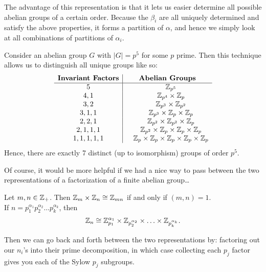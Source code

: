 \documentclass{memoir}
\begin{document}
The advantage of this representation is that it lets us easier determine all possible abelian groups of a certain order. Because the \(\beta_i\) are all uniquely determined and satisfy the above properties, it forms a partition of  \(\alpha  \), and hence we simply look at all combinations of partitions of \(\alpha_i\).

\begin{exmp}
	Consider an abelian group \(G\) with \(\left| G \right| = p^{5}\) for some \(p\) prime. Then this technique allows us to distinguish all unique groups like so:
	\begin{align*}
		\begin{array}{c | c}
		\textbf{Invariant Factors} & \textbf{Abelian Groups}\\
			\hline
		5 &\quad \mathbb{Z}_{p^{5}}\\
		4,1 &\quad \mathbb{Z}_{p^{4}}\times \mathbb{Z}_p\\
		3,2 &\quad \mathbb{Z}_{p^3}\times \mathbb{Z}_{p^2}\\
		3,1,1 &\quad \mathbb{Z}_{p^3}\times \mathbb{Z}_p \times \mathbb{Z}_p\\
		2,2,1 &\quad \mathbb{Z}_{p^2}\times \mathbb{Z}_{p^2}\times \mathbb{Z}_p\\
		2,1,1,1 &\quad \mathbb{Z}_{p^2}\times \mathbb{Z}_p\times \mathbb{Z}_p\times \mathbb{Z}_p\\
		1,1,1,1,1 &\quad \mathbb{Z}_p\times \mathbb{Z}_p \times \mathbb{Z}_p \times \mathbb{Z}_p \times \mathbb{Z}_p
		\end{array}
	\end{align*}
	Hence, there are exactly 7 distinct (up to isomorphism) groups of order \(p^{5}\).
\end{exmp}

Of course, it would be more helpful if we had a nice way to pass between the two representations of a factorization of a finite abelian group\ldots
\begin{prop}
	Let \(m,n \in \mathbb{Z}_+\). Then \(\mathbb{Z}_{m}\times \mathbb{Z}_n \cong \mathbb{Z}_{mn}\) if and only if \((m,n) = 1\).\\

	If \(n = p_1^{\alpha_1}p_2^{\alpha_2}\ldots p_k^{\alpha_k}\), then
	\begin{align*}
		\mathbb{Z}_n \cong \mathbb{Z}_{p_1}^{\alpha_1}\times \mathbb{Z}_{p_2^{\alpha_2}} \times  \ldots \times \mathbb{Z}_{p_k^{\alpha_k}}.
	\end{align*}
\end{prop}

Then we can go back and forth between the two representations by: factoring out our \(n_i\)'s into their prime decomposition, in which case collecting each \(p_j\) factor gives you each of the Sylow \(p_j\) subgroups.\\
\end{document}
